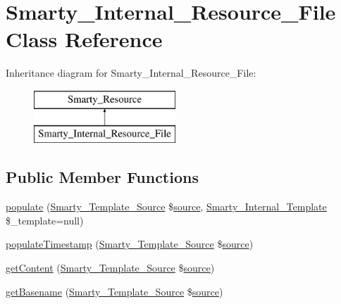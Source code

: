 \hypertarget{class_smarty___internal___resource___file}{}\section{Smarty\+\_\+\+Internal\+\_\+\+Resource\+\_\+\+File Class Reference}
\label{class_smarty___internal___resource___file}
Inheritance diagram for Smarty\+\_\+\+Internal\+\_\+\+Resource\+\_\+\+File\+:\begin{figure}[H]
\begin{center}
\leavevmode
\includegraphics[height=2.000000cm]{class_smarty___internal___resource___file}
\end{center}
\end{figure}
\subsection*{Public Member Functions}
\begin{DoxyCompactItemize}
\item 
\hyperlink{class_smarty___internal___resource___file_a07a771f460d625d63fcb72d0aeed0b01}{populate} (\hyperlink{class_smarty___template___source}{Smarty\+\_\+\+Template\+\_\+\+Source} \$\hyperlink{class_smarty___resource_ab6ac6b66dac2da6c41a178102f7d53e4}{source}, \hyperlink{class_smarty___internal___template}{Smarty\+\_\+\+Internal\+\_\+\+Template} \$\+\_\+template=null)
\item 
\hyperlink{class_smarty___internal___resource___file_a0935298de0f84d80fdb2ec7c9c52a763}{populate\+Timestamp} (\hyperlink{class_smarty___template___source}{Smarty\+\_\+\+Template\+\_\+\+Source} \$\hyperlink{class_smarty___resource_ab6ac6b66dac2da6c41a178102f7d53e4}{source})
\item 
\hyperlink{class_smarty___internal___resource___file_a0e40116a3d4f59cf7ea39f83441169b8}{get\+Content} (\hyperlink{class_smarty___template___source}{Smarty\+\_\+\+Template\+\_\+\+Source} \$\hyperlink{class_smarty___resource_ab6ac6b66dac2da6c41a178102f7d53e4}{source})
\item 
\hyperlink{class_smarty___internal___resource___file_a91cdf7da12bdc51906539506dd26159b}{get\+Basename} (\hyperlink{class_smarty___template___source}{Smarty\+\_\+\+Template\+\_\+\+Source} \$\hyperlink{class_smarty___resource_ab6ac6b66dac2da6c41a178102f7d53e4}{source})
\end{DoxyCompactItemize}
